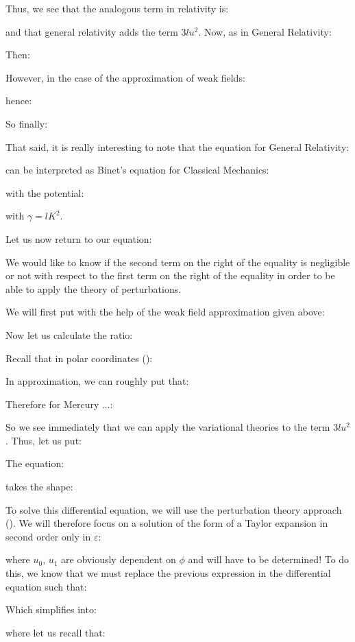 	Thus, we see that the analogous term in relativity is:
	
	and that general relativity adds the term $3lu^2$. Now, as in General Relativity:
	
	Then:
	
	However, in the case of the approximation of weak fields:
	
	hence:
	
	So finally:
	
	That said, it is really interesting to note that the equation for General Relativity:
	
	can be interpreted as Binet's equation for Classical Mechanics:
	
	with the potential:
	
	with $\gamma=lK^2$.
	
	Let us now return to our equation:
	
	We would like to know if the second term on the right of the equality is negligible or not with respect to the first term on the right of the equality in order to be able to apply the theory of perturbations.

	We will first put with the help of the weak field approximation given above:
	
	Now let us calculate the ratio:
	
	Recall that in polar coordinates ():
	
	In approximation, we can roughly put that:
	
	Therefore for Mercury ...:
	
	So we see immediately that we can apply the variational theories to the term $3lu^2$. Thus, let us put:
	
	The equation:
	
	takes the shape:
	
	To solve this differential equation, we will use the perturbation theory approach (). We will therefore focus on a solution of the form of a Taylor expansion in second order only in $\varepsilon$:
	
	where $u_0$, $u_1$ are obviously dependent on $\phi$ and will have to be determined! To do this, we know that we must replace the previous expression in the differential equation such that:
	
	Which simplifies into:
	
	where let us recall that:
	
